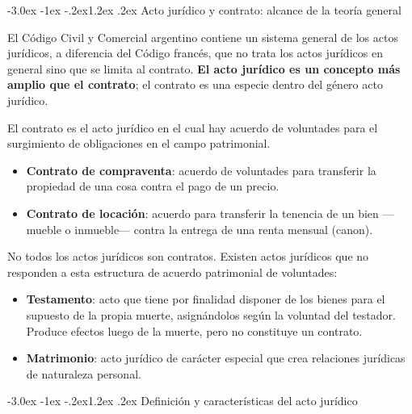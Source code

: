 \documentclass[12pt,oneside]{book}
\makeatletter
\renewcommand\section{\@startsection{section}{1}{\z@}%
  {-3.0ex \@plus -1ex \@minus -.2ex}{1.2ex \@plus .2ex}%
  {\normalfont\large\bfseries\color{acento}}}
\makeatother
\begin{document}
\section{Acto jurídico y contrato: alcance de la teoría general}

El Código Civil y Comercial argentino contiene un sistema general de los actos jurídicos, a diferencia del Código francés, que no trata los actos jurídicos en general sino que se limita al contrato. \textbf{El acto jurídico es un concepto más amplio que el contrato}; el contrato es una especie dentro del género acto jurídico.

\begin{definicion}[{Contrato}]
El contrato es el acto jurídico en el cual hay acuerdo de voluntades para el surgimiento de obligaciones en el campo patrimonial.
\end{definicion}

\begin{ejemplo}
\begin{itemize}
    \item \textbf{Contrato de compraventa}: acuerdo de voluntades para transferir la propiedad de una cosa contra el pago de un precio.
    \item \textbf{Contrato de locación}: acuerdo para transferir la tenencia de un bien ---mueble o inmueble--- contra la entrega de una renta mensual (canon).
\end{itemize}
\end{ejemplo}

No todos los actos jurídicos son contratos. Existen actos jurídicos que no responden a esta estructura de acuerdo patrimonial de voluntades:

\begin{itemize}
    \item \textbf{Testamento}: acto que tiene por finalidad disponer de los bienes para el supuesto de la propia muerte, asignándolos según la voluntad del testador. Produce efectos luego de la muerte, pero no constituye un contrato.
    \item \textbf{Matrimonio}: acto jurídico de carácter especial que crea relaciones jurídicas de naturaleza personal.
\end{itemize}

\section{Definición y características del acto jurídico}
\end{document}
